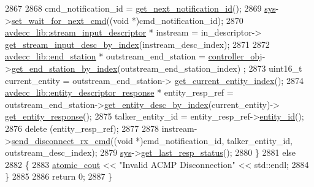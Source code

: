 \begin{DoxyCode}
2867 
2868         cmd\_notification\_id = \hyperlink{classcmd__line_a57486218387d1aa9d262eb7c176154ad}{get\_next\_notification\_id}();
2869         \hyperlink{classcmd__line_a485db4800e331cb4052c447fdf5d154e}{sys}->\hyperlink{classavdecc__lib_1_1system_a26b769584f10225077da47583edda33e}{set\_wait\_for\_next\_cmd}((\textcolor{keywordtype}{void} *)cmd\_notification\_id);
2870         \hyperlink{classavdecc__lib_1_1stream__input__descriptor}{avdecc\_lib::stream\_input\_descriptor} * instream = in\_descriptor->
      \hyperlink{classavdecc__lib_1_1configuration__descriptor_a69cfe9032cea21937b4153878f8a925c}{get\_stream\_input\_desc\_by\_index}(instream\_desc\_index);
2871 
2872         \hyperlink{classavdecc__lib_1_1end__station}{avdecc\_lib::end\_station} * outstream\_end\_station = 
      \hyperlink{classcmd__line_af0a7784509e5bf1210a2aa19cea5df70}{controller\_obj}->\hyperlink{classavdecc__lib_1_1controller_a2a8ec1205ea0d5fdd6f833285257d0d0}{get\_end\_station\_by\_index}(outstream\_end\_station\_index)
      ;
2873         uint16\_t current\_entity = outstream\_end\_station->
      \hyperlink{classavdecc__lib_1_1end__station_aaf7e2defcfdf88c62c04fd88bd49787d}{get\_current\_entity\_index}();
2874         \hyperlink{classavdecc__lib_1_1entity__descriptor__response}{avdecc\_lib::entity\_descriptor\_response} * entity\_resp\_ref = 
      outstream\_end\_station->\hyperlink{classavdecc__lib_1_1end__station_a7456434346294f611e4d37255be4051b}{get\_entity\_desc\_by\_index}(current\_entity)->
      \hyperlink{classavdecc__lib_1_1entity__descriptor_ac31dd117f0c931ae93c8ba52df7211bd}{get\_entity\_response}();
2875         talker\_entity\_id = entity\_resp\_ref->\hyperlink{classavdecc__lib_1_1entity__descriptor__response_a3374e7e9d63f8e1756480b16df9bc0c0}{entity\_id}();
2876         \textcolor{keyword}{delete} (entity\_resp\_ref);
2877 
2878         instream->\hyperlink{classavdecc__lib_1_1stream__input__descriptor_a9cb09f626eaf3616a4260825c7f30f44}{send\_disconnect\_rx\_cmd}((\textcolor{keywordtype}{void} *)cmd\_notification\_id, 
      talker\_entity\_id, outstream\_desc\_index);
2879         \hyperlink{classcmd__line_a485db4800e331cb4052c447fdf5d154e}{sys}->\hyperlink{classavdecc__lib_1_1system_aa63e8d1a4e51f695cdcccc9340922407}{get\_last\_resp\_status}();
2880     \}
2881     \textcolor{keywordflow}{else}
2882     \{
2883         \hyperlink{cmd__line_8h_a0bc38ccc65c79ba06c6fcd7b4bf554c3}{atomic\_cout} << \textcolor{stringliteral}{"Invalid ACMP Disconnection"} << std::endl;
2884     \}
2885 
2886     \textcolor{keywordflow}{return} 0;
2887 \}
\end{DoxyCode}


